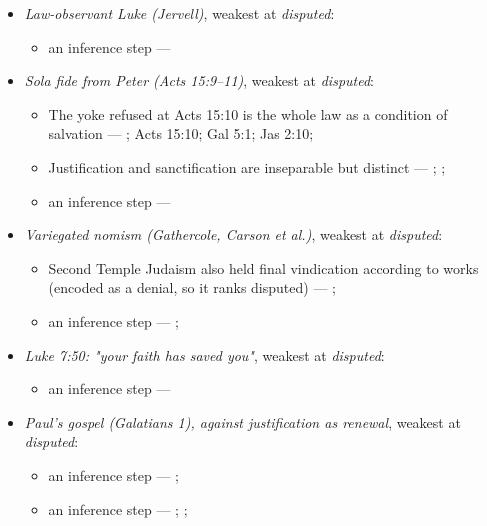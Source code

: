 \documentclass[11pt]{article}
\begin{document}
\begin{itemize}
\item \emph{Law-observant Luke (Jervell)}, weakest at \emph{disputed}:
\begin{itemize}
\item an inference step --- \cite{jervell-luke-people-god-1972}
\end{itemize}
\item \emph{Sola fide from Peter (Acts 15:9–11)}, weakest at \emph{disputed}:
\begin{itemize}
\item The yoke refused at Acts 15:10 is the whole law as a condition of salvation --- \cite[ad loc. Acts 15:10]{bruce-acts-1988}; Acts 15:10; Gal 5:1; Jas 2:10; \cite{das-paul-law-covenant-2001}
\item Justification and sanctification are inseparable but distinct --- \cite[XIII.1]{westminster-confession-1647}; \cite[XI.1]{westminster-confession-1647}; \cite[III.xi.6]{calvin-institutes-1960}
\item an inference step --- \cite[Trent, Session VI (1547), canon 9]{tanner-decrees-1990}
\end{itemize}
\item \emph{Variegated nomism (Gathercole, Carson et al.)}, weakest at \emph{disputed}:
\begin{itemize}
\item Second Temple Judaism also held final vindication according to works (encoded as a denial, so it ranks disputed) --- \cite{gathercole-where-boasting-2002}; \cite{carson-variegated-nomism-1-2001}
\item an inference step --- \cite{gathercole-where-boasting-2002}; \cite{carson-variegated-nomism-1-2001}
\end{itemize}
\item \emph{Luke 7:50: "your faith has saved you"}, weakest at \emph{disputed}:
\begin{itemize}
\item an inference step --- \cite[Trent, Session VI (1547), canon 9]{tanner-decrees-1990}
\end{itemize}
\item \emph{Paul's gospel (Galatians 1), against justification as renewal}, weakest at \emph{disputed}:
\begin{itemize}
\item an inference step --- \cite[ad loc. Gal 1:6]{moo-galatians-2013}; \cite[XI.1]{westminster-confession-1647}
\item an inference step --- \cite[XI.1]{westminster-confession-1647}; \cite[III.xi.2]{calvin-institutes-1960}; \cite{morris-apostolic-preaching-1965}

\end{itemize}
\end{itemize}
\end{document}

